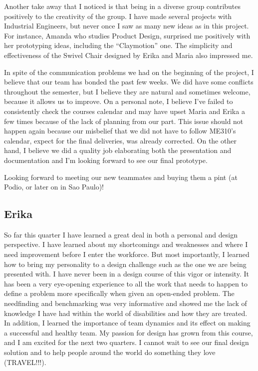 Another take away that I noticed is that being in a diverse group contributes positively to the creativity of the group.  I have made several projects with Industrial Engineers, but never once I saw as many new ideas as in this project. For instance, Amanda who studies Product Design, surprised me positively with her prototyping ideas, including the “Claymotion” one. The simplicity and effectiveness of the Swivel Chair designed by Erika and Maria also impressed me.

In spite of the communication problems we had on the beginning of the project, I believe that our team has bonded the past few weeks. We did have some conflicts throughout the semester, but I believe they are natural and sometimes welcome, because it allows us to improve. On a personal note, I believe I’ve failed to consistently check the courses calendar and may have upset Maria and Erika a few times because of the lack of planning from our part. This issue should not happen again because our misbelief that we did not have to follow ME310’s calendar, expect for the final deliveries, was already corrected. On the other hand, I believe we did a quality job elaborating both the presentation and documentation and I’m looking forward to see our final prototype.

Looking forward to meeting our new teammates and buying them a pint (at Podio, or later on in Sao Paulo)!

\subsection{Erika}
So far this quarter I have learned a great deal in both a personal and design perspective.  I have learned about my shortcomings and weaknesses and where I need improvement before I enter the workforce.  But most importantly, I learned how to bring my personality to a design challenge such as the one we are being presented with.  I have never been in a design course of this vigor or intensity.  It has been a very eye-opening experience to all the work that needs to happen to define a problem more specifically when given an open-ended problem.  The needfinding and benchmarking was very informative and showed me the lack of knowledge I have had within the world of disabilities and how they are treated.  In addition, I learned the importance of team dynamics and its effect on making a successful and healthy team.  My passion for design has grown from this course, and I am excited for the next two quarters.  I cannot wait to see our final design solution and to help people around the world do something they love (TRAVEL!!!). 

